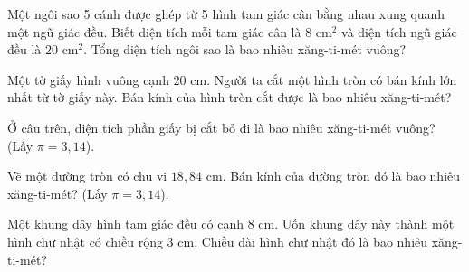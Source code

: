 \begin{ex}
  Một ngôi sao 5 cánh được ghép từ 5 hình tam giác cân bằng nhau xung quanh một ngũ giác đều. Biết diện tích mỗi tam giác cân là $8\text{ cm}^2$ và diện tích ngũ giác đều là $20\text{ cm}^2$. Tổng diện tích ngôi sao là bao nhiêu xăng-ti-mét vuông?
\end{ex}

\begin{ex}
  Một tờ giấy hình vuông cạnh $20\text{ cm}$. Người ta cắt một hình tròn có bán kính lớn nhất từ tờ giấy này. Bán kính của hình tròn cắt được là bao nhiêu xăng-ti-mét?
\end{ex}

\begin{ex}
  Ở câu trên, diện tích phần giấy bị cắt bỏ đi là bao nhiêu xăng-ti-mét vuông? (Lấy $\pi = 3{,}14$).
\end{ex}

\begin{ex}
  Vẽ một đường tròn có chu vi $18{,}84\text{ cm}$. Bán kính của đường tròn đó là bao nhiêu xăng-ti-mét? (Lấy $\pi = 3{,}14$).
\end{ex}

\begin{ex}
  Một khung dây hình tam giác đều có cạnh $8\text{ cm}$. Uốn khung dây này thành một hình chữ nhật có chiều rộng $3\text{ cm}$. Chiều dài hình chữ nhật đó là bao nhiêu xăng-ti-mét?
\end{ex}
